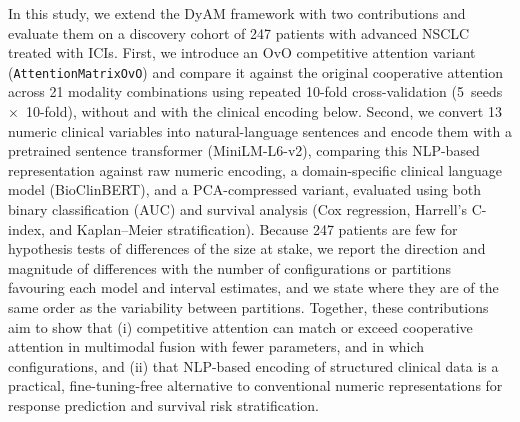 In this study, we extend the DyAM framework with two contributions and
evaluate them on a discovery cohort of 247 patients with advanced NSCLC
treated with ICIs.
First, we introduce an OvO competitive attention variant
(\texttt{AttentionMatrixOvO}) and compare it against the original cooperative
attention across 21 modality combinations using repeated 10-fold cross-validation
(5~seeds~$\times$~10-fold), without and with the clinical encoding below.
Second, we convert 13 numeric clinical variables into natural-language
sentences and encode them with a pretrained sentence transformer
(MiniLM-L6-v2), comparing this NLP-based representation against raw numeric
encoding, a domain-specific clinical language model (BioClinBERT), and a
PCA-compressed variant, evaluated using both binary classification (AUC) and
survival analysis (Cox regression, Harrell's C-index, and
Kaplan--Meier stratification).
Because 247 patients are few for hypothesis tests of differences of
the size at stake, we report the direction and magnitude of differences with the
number of configurations or partitions favouring each model and interval estimates,
and we state where they are of the same order as the variability between partitions.
Together, these contributions aim to show that (i) competitive attention can match or exceed
cooperative attention in multimodal fusion with fewer parameters, and in which configurations, and (ii) that NLP-based
encoding of structured clinical data is a practical, fine-tuning-free
alternative to conventional numeric representations for response prediction and
survival risk stratification.
